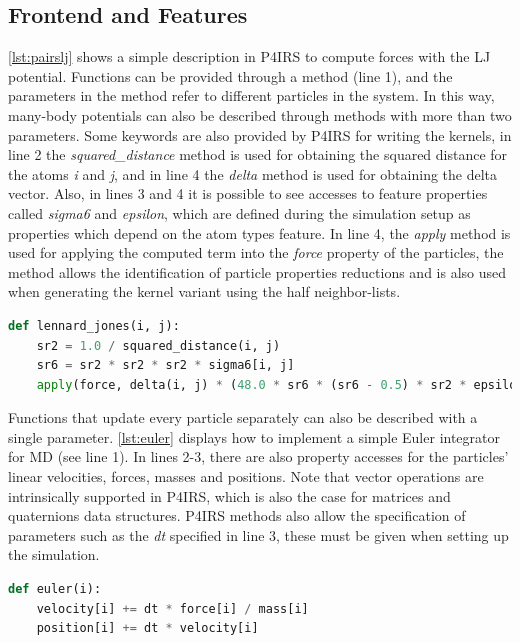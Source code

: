 \documentclass[Afour,sageh,times]{sagej}
\begin{document}
\subsection{Frontend and Features}
\label{sec:frontend}

\autoref{lst:pairslj} shows a simple description in P4IRS to compute forces with the \ac{LJ} potential.
Functions can be provided through a method (line 1), and the parameters in the method refer to different particles in the system.
In this way, many-body potentials can also be described through methods with more than two parameters.
Some keywords are also provided by P4IRS for writing the kernels, in line 2 the \emph{squared\_distance} method is used for obtaining the squared distance for the atoms \emph{i} and \emph{j}, and in line 4 the \emph{delta} method is used for obtaining the delta vector.
Also, in lines 3 and 4 it is possible to see accesses to feature properties called \emph{sigma6} and \emph{epsilon}, which are defined during the simulation setup as properties which depend on the atom types feature.
In line 4, the \emph{apply} method is used for applying the computed term into the \emph{force} property of the particles, the method allows the identification of particle properties reductions and is also used when generating the kernel variant using the half neighbor-lists.

\begin{lstlisting}[language=Python,
		   label={lst:pairslj},
		   caption={Lennard-Jones force description in P4IRS.}]
def lennard_jones(i, j):
    sr2 = 1.0 / squared_distance(i, j)
    sr6 = sr2 * sr2 * sr2 * sigma6[i, j]
    apply(force, delta(i, j) * (48.0 * sr6 * (sr6 - 0.5) * sr2 * epsilon[i, j]))
\end{lstlisting}

Functions that update every particle separately can also be described with a single parameter.
\autoref{lst:euler} displays how to implement a simple Euler integrator for \ac{MD} (see line 1).
In lines 2-3, there are also property accesses for the particles' linear velocities, forces, masses and positions.
Note that vector operations are intrinsically supported in P4IRS, which is also the case for matrices and quaternions data structures.
P4IRS methods also allow the specification of parameters such as the \emph{dt} specified in line 3, these must be given when setting up the simulation.

\begin{lstlisting}[language=Python,
		   label={lst:euler},
		   caption={Euler integrator description in P4IRS.}]
def euler(i):
    velocity[i] += dt * force[i] / mass[i]
    position[i] += dt * velocity[i]
\end{lstlisting}
\end{document}
